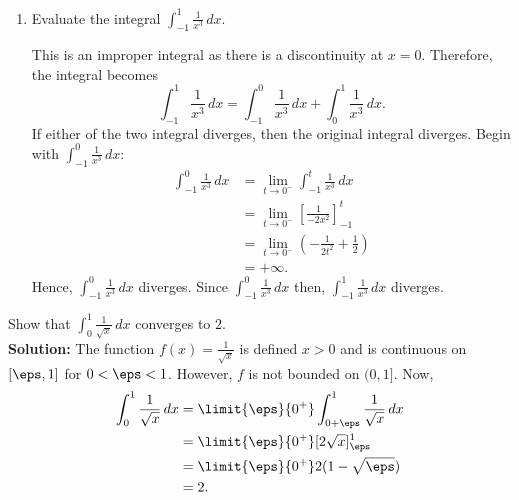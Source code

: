 \documentclass[12pt, a4paper]{article}
\begin{document}
\begin{example}
\begin{enumerate}
\begin{solution}
\begin{figure}[H]
                 \begin{center}
                    
                 \end{center}
            \end{figure}
        \end{solution}
        \item Evaluate the integral \(\int_{-1}^{1} \frac{1}{x^3} \, dx\).
        \begin{solution}
        This is an improper integral as there is a discontinuity at \(x=0\). Therefore, the integral becomes
        \[\int_{-1}^{1} \frac{1}{x^3} \, dx = \int_{-1}^{0} \frac{1}{x^3} \, dx + \int_{0}^{1} \frac{1}{x^3} \, dx.\]
        If either of the two integral diverges, then the original integral diverges. Begin with \(\int_{-1}^{0} \frac{1}{x^3} \, dx\):
        \[\begin{aligned}
            \int_{-1}^{0} \frac{1}{x^3} \, dx &= \lim_{t\to 0^-} \int_{-1}^{t} \frac{1}{x^3} \, dx \\
            &= \lim_{t \to 0^-} \left[ \frac{1}{-2x^2} \right]_{-1}^{t} \\
            &= \lim_{t \to 0^-} \left( -\frac{1}{2t^2}+\frac{1}{2} \right) \\
            &= +\infty.
        \end{aligned}\]
        Hence, \(\int_{-1}^{0} \frac{1}{x^3} \, dx\) diverges. Since \(\int_{-1}^{0} \frac{1}{x^3} \, dx\) then, \(\int_{-1}^{1} \frac{1}{x^3} \, dx\) diverges.
        \end{solution}
    \end{enumerate}
\end{example}

\begin{example}
    Show that \(\int_0^1 \frac{1}{\sqrt{x}} \, dx\) converges to \(2\). \\
    \textbf{Solution:} The function \(f(x)= \frac{1}{\sqrt{x}}\) is defined \(x>0\) and is continuous on \([\eps,1]\) for \(0<\eps<1\). However, \(f\) is not bounded on \((0,1]\). Now,
    \[\begin{aligned}
        \int_0^1 \frac{1}{\sqrt{x}} \, dx &= \limit{\eps}{0^+} \int_{0+\eps}^{1} \frac{1}{\sqrt{x}} \, dx \\
        &= \limit{\eps}{0^+} [2\sqrt{x}]_{\eps}^1 \\
        &= \limit{\eps}{0^+} 2(1-\sqrt{\eps}) \\
        &= 2.
    \end{aligned}\]
\end{example}
\end{document}
